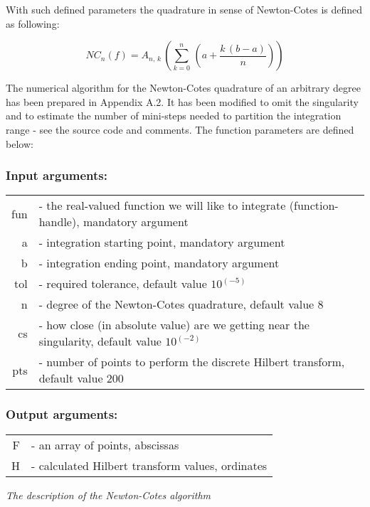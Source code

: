 \documentclass[12pt,twoside,a4paper]{article}
\numberwithin{equation}{subsection}
\numberwithin{figure}{subsection}
\begin{document}
With such defined parameters the quadrature in sense of Newton-Cotes is defined as following:

\begin{equation} \label{eq:nc_mainequation}
   {NC_{n}}(f)={A_{n, \,k}}\, \left(  \! \sum_{k=0}^{n}\, (a + \frac {k\,(b - a)}{n}) \!  \right) 
\end{equation}

The numerical algorithm for the Newton-Cotes quadrature of an arbitrary degree has been prepared in Appendix A.2. It has been
modified to omit the singularity and to estimate the number of mini-steps needed to partition the integration range - see the
source code and comments. The function parameters are defined below:

\subsubsection*{Input arguments: }

\begin{tabular}{r l}
  fun & - the real-valued function we will like to integrate (function-handle), mandatory argument \\
  a & - integration starting point, mandatory argument \\
  b & - integration ending point, mandatory argument \\
  tol & - required tolerance, default value $10^{( - 5)}$ \\
  n & - degree of the Newton-Cotes quadrature, default value 8 \\
  cs & - how close (in absolute value) are we getting near the singularity, default value $10^{( - 2)}$ \\
  pts & - number of points to perform the discrete Hilbert transform, default value 200 \\
\end{tabular}


\subsubsection*{Output arguments:}
\begin{tabular}{r l}
  F & - an array of points, abscissas \\
  H & - calculated Hilbert transform values, ordinates \\
\end{tabular}

\textit{The description of the Newton-Cotes algorithm}
\end{document}
